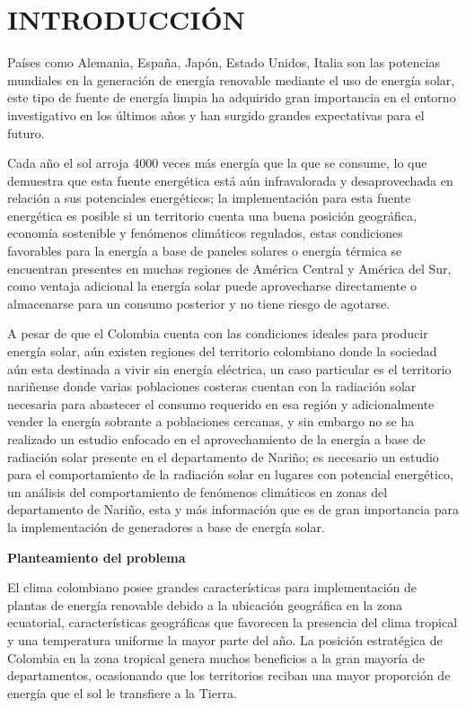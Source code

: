 \chapter*{INTRODUCCIÓN}
 
Países como Alemania, España, Japón, Estado Unidos, Italia son las potencias mundiales 
en la generación de energía renovable mediante el uso de energía solar,  este tipo de 
fuente de energía limpia ha adquirido gran importancia en el entorno investigativo en los 
últimos años y han surgido grandes expectativas para el futuro. 

Cada año el sol arroja 4000 veces más energía que la que se consume, lo que demuestra 
que esta fuente energética está aún infravalorada y desaprovechada  en relación a sus potenciales energéticos; 
la implementación para esta fuente energética es posible si un territorio cuenta una buena posición 
geográfica, economía sostenible y fenómenos climáticos regulados, estas condiciones favorables para la energía a base 
de paneles solares o energía térmica se encuentran presentes en muchas regiones de América Central y América del Sur,
 como ventaja adicional la energía solar puede aprovecharse directamente o almacenarse para un consumo posterior y no tiene riesgo de agotarse.

A pesar de que el Colombia cuenta con las condiciones ideales para producir energía solar, 
aún existen regiones del territorio colombiano donde la sociedad aún esta destinada a vivir sin energía eléctrica, un caso 
particular es el territorio nariñense donde varias poblaciones costeras cuentan con la radiación solar
necesaria para abastecer el consumo requerido en esa región y adicionalmente vender la energía sobrante a poblaciones cercanas, y sin embargo
no se ha realizado un estudio enfocado en el aprovechamiento de la energía a base de radiación solar presente en el departamento de Nariño; es necesario un
estudio para el comportamiento de la radiación solar en lugares con potencial energético, un análisis del comportamiento de fenómenos 
climáticos en zonas del departamento de Nariño, esta y más información que es de gran importancia para la implementación 
de generadores a base de energía solar.

\textbf{Planteamiento del problema}

El clima colombiano posee grandes características para implementación de plantas de energía renovable debido a 
la ubicación geográfica en la zona ecuatorial, características geográficas que favorecen la presencia del clima tropical 
y una temperatura uniforme la mayor parte del año. La posición estratégica de Colombia en la zona tropical genera 
muchos beneficios a la gran mayoría de departamentos, ocasionando que los territorios reciban una mayor proporción 
de energía que el sol le transfiere a la Tierra. 

